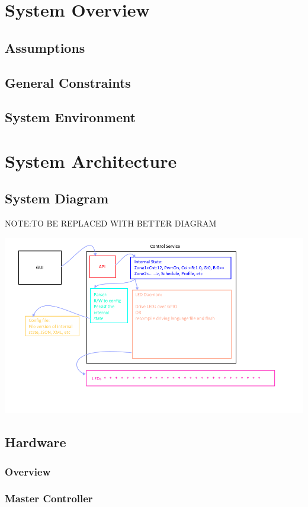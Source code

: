\documentclass[onecolumn, draftclsnofoot,10pt, compsoc]{IEEEtran}
\begin{document}
	\section{System Overview}
		\subsection{Assumptions}
		\subsection{General Constraints}
		\subsection{System Environment}


	\section{System Architecture}
		\subsection{System Diagram}
		NOTE:TO BE REPLACED WITH BETTER DIAGRAM

		\includegraphics[width=\linewidth]{systemDiagrams/sysdiag.png}

		\subsection{Hardware}
			\subsubsection{Overview}
			\subsubsection{Master Controller}
\end{document}

